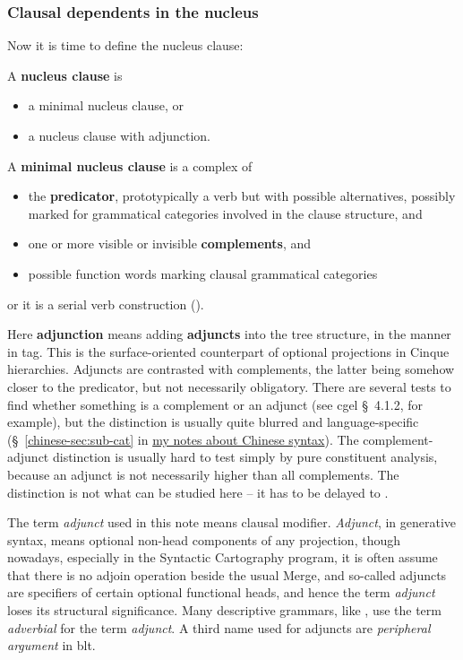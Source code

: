 \documentclass[UTF8, a4paper, oneside, scheme=plain]{ctexart}
\newcommand*{\citesec}[1]{\S~{#1}}
\newcommand*{\concept}[1]{\textbf{#1}}
\newcommand*{\term}[1]{\emph{#1}}
\newcommand{\chinesenote}{\href{../Chinese/main.pdf}{my notes about Chinese syntax}}
\begin{document}
\subsubsection{Clausal dependents in the nucleus}\label{sec:nucleus-dependents}

Now it is time to define the nucleus clause:
\begin{exe}
    \ex\label{ex:nucleus-def} A \concept{nucleus clause} is 
    \begin{itemize}
        \item a minimal nucleus clause, or 
        \item a nucleus clause with adjunction.
    \end{itemize}
    \ex\label{ex:minimal-nucleus-def} A \concept{minimal nucleus clause} is a complex of 
    \begin{itemize}
        \item the \concept{predicator}, 
        prototypically a verb but with possible alternatives,
        possibly marked for grammatical categories involved in the clause structure, and 
        \item one or more visible or invisible \concept{complements}, and 
        \item possible function words marking clausal grammatical categories
    \end{itemize}
    or it is a serial verb construction ().
\end{exe} 
Here \concept{adjunction} means adding \concept{adjuncts} into the tree structure, 
in the manner in \ac{tag}.
This is the surface-oriented counterpart of optional projections in Cinque hierarchies.
Adjuncts are contrasted with complements,
the latter being somehow closer to the predicator, 
but not necessarily obligatory.
There are several tests to find whether something is a complement or an adjunct
(see \ac{cgel} \citesec{4.1.2}, for example),
but the distinction is usually quite blurred and language-specific 
(\citesec{\ref{chinese-sec:sub-cat}} in \chinesenote).
The complement-adjunct distinction is usually hard to test simply by pure constituent analysis,
because an adjunct is not necessarily higher than all complements.
The distinction is not what can be studied here -- 
it has to be delayed to .

The term \term{adjunct} used in this note means clausal modifier.
\term{Adjunct}, in generative syntax, 
means optional non-head components of any projection,
though nowadays, especially in the Syntactic Cartography program, 
it is often assume that there is no adjoin operation beside the usual Merge,
and so-called adjuncts are specifiers of certain optional functional heads,
and hence the term \term{adjunct} loses its structural significance.
Many descriptive grammars, like \citep{quirk2010comprehensive}, 
use the term \term{adverbial} for the term \term{adjunct}.
A third name used for adjuncts are \term{peripheral argument} in \ac{blt}.
\end{document}
